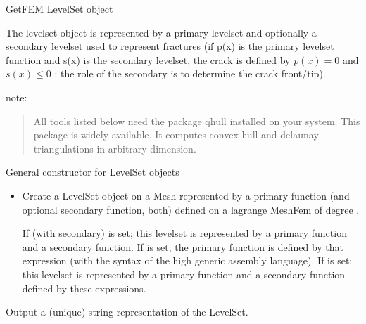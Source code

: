 \documentclass[a4paper,11pt,english]{sphinxmanual}
\begin{document}
\begin{fulllineitems}
\label{\detokenize{python/cmdref_LevelSet:getfem.LevelSet}}
GetFEM LevelSet object

The level\sphinxhyphen{}set object is represented by a primary level\sphinxhyphen{}set and optionally
a secondary level\sphinxhyphen{}set used to represent fractures (if p(x) is the primary
level\sphinxhyphen{}set function and s(x) is the secondary level\sphinxhyphen{}set, the crack is
defined by \(p(x)=0\) and \(s(x)\leq0\) : the role of the secondary is to determine
the crack front/tip).

note:
\begin{quote}

All tools listed below need the package qhull installed on your
system. This package is widely available. It computes convex hull and
delaunay triangulations in arbitrary dimension.
\end{quote}

General constructor for LevelSet objects
\begin{itemize}
\item {} 
Create a LevelSet object on a Mesh represented by a primary function
(and optional secondary function, both) defined on a lagrange MeshFem of
degree .

If  (with secondary) is set; this levelset is represented by a
primary function and a secondary function. If  is set; the primary
function is defined by that expression (with the syntax of the high
generic assembly language). If  is set; this levelset
is represented by a primary function and a secondary function defined
by these expressions.

\end{itemize}

\begin{fulllineitems}
\label{\detokenize{python/cmdref_LevelSet:getfem.LevelSet.char}}
Output a (unique) string representation of the LevelSet.


\end{fulllineitems}
\end{fulllineitems}
\end{document}
